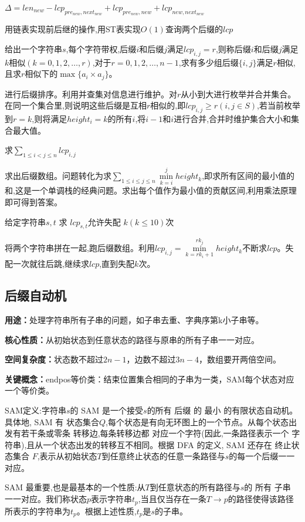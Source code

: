 \documentclass[a4paper, fontset=none]{ctexart}
\begin{document}
$\Delta=len_{new}-lcp_{pre_{new}, next_{new}}+lcp_{pre_{new}, new}+lcp_{new, next_{new}}$

用链表实现前后继的操作,用ST表实现$O(1)$查询两个后缀的$lcp$

给出一个字符串$s$,每个字符带权,后缀$i$和后缀$j$满足$lcp_{i, j}=r$,则称后缀$i$和后缀$j$满足$k$相似$(k=0, 1, 2,\ldots, r)$,对于$r=0, 1, 2,\ldots, n-1$,求有多少组后缀$\{i, j\}$满足$r$相似,且求$r$相似下的$\max\{a_i\times a_j\}$。

进行后缀排序。利用并查集对信息进行维护。对$r$从小到大进行枚举并合并集合。在同一个集合里,则说明这些后缀是互相$r$相似的,即$lcp_{i, j}\ge r(i, j\in S)$,若当前枚举到$r=k$,则将满足$height_i=k$的所有$i$,将$i-1$和$i$进行合并,合并时维护集合大小和集合最大值。

求$\sum\limits_{1\leqslant i < j\leqslant n}lcp_{i, j}$

求出后缀数组。问题转化为求$\sum\limits_{1\leqslant i\leqslant j\leqslant n}\min\limits_{k=i}^jheight_{k}$,即求所有区间的最小值的和,这是一个单调栈的经典问题。求出每个值作为最小值的贡献区间,利用乘法原理即可得到答案。

给定字符串$s, t$ 求 $lcp_{s, t}$允许失配 $k(k\leqslant 10)$次

将两个字符串拼在一起,跑后缀数组。利用$lcp_{i, j}=\min\limits_{k=rk_i+1}^{rk_j}height_k$不断求$lcp$。失配一次就往后跳,继续求$lcp$,直到失配$k$次。
\subsection{后缀自动机}
\textbf{用途：}处理字符串所有子串的问题，如子串去重、字典序第k小子串等。

\textbf{核心性质：}从初始状态到任意状态的路径与原串的所有子串一一对应。

\textbf{空间复杂度：}状态数不超过$2n-1$，边数不超过$3n-4$，数组要开两倍空间。

\textbf{关键概念：}endpos等价类：结束位置集合相同的子串为一类，SAM每个状态对应一个等价类。

SAM定义:字符串$s$的 SAM 是一个接受$s$的所有 后缀 的 最小 的有限状态自动机。具体地, SAM 有 状态集合$Q$,每个状态是有向无环图上的一个节点。从每个状态出发有若干条或零条 转移边,每条转移边都 对应一个字符(因此,一条路径表示一个 字符串),且从一个状态出发的转移互不相同。根据 DFA 的定义, SAM 还存在 终止状态集合 $F$,表示从初始状态$T$到任意终止状态的任意一条路径与$s$的每一个后缀一一对应。

SAM 最重要,也是最基本的一个性质:从$T$到任意状态的所有路径与$s$的 所有 子串 一一对应。我们称状态$p$表示字符串$t_p$,当且仅当存在一条$T\rightarrow p$的路径使得该路径所表示的字符串为$t_p$。根据上述性质,$t_p$是$s$的子串。
\end{document}
